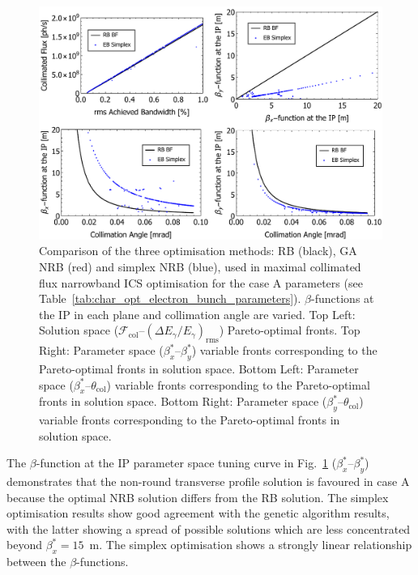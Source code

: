 \documentclass[../main.tex]{subfiles}
\begin{document}
\begin{figure}[!h]
\centering
\includegraphics[width=\textwidth]{Figures/Optimisation_and_Characterisation_of_Inverse_Compton_Scattering_Sources/CaseAoptcomp.pdf}
\caption{Comparison of the three optimisation methods: RB (black), GA NRB (red) and simplex NRB (blue), used in maximal collimated flux narrowband ICS optimisation for the case A parameters (see Table~\ref{tab:char_opt_electron_bunch_parameters}). $\beta$-functions at the IP in each plane and collimation angle are varied. Top Left: Solution space ($\mathcal{F}_{\mathrm{col}}$--$\left(\Delta E_{\gamma}/E_{\gamma}\right)_{\mathrm{rms}}$) Pareto-optimal fronts. Top Right: Parameter space ($\beta_{x}^{*}$--$\beta_{y}^{*}$) variable fronts corresponding to the Pareto-optimal fronts in solution space. Bottom Left: Parameter space ($\beta_{x}^{*}$--$\theta_{\mathrm{col}}$) variable fronts corresponding to the Pareto-optimal fronts in solution space. Bottom Right: Parameter space ($\beta_{y}^{*}$--$\theta_{\mathrm{col}}$) variable fronts corresponding to the Pareto-optimal fronts in solution space.}
\label{fig:case_A_optimisation_comparison}
\end{figure}

The $\beta$-function at the IP parameter space tuning curve in Fig.~\ref{fig:case_A_optimisation_comparison} ($\beta_{x}^{*}$--$\beta_{y}^{*}$) demonstrates that the non-round transverse profile solution is favoured in case A because the optimal NRB solution differs from the RB solution. The simplex optimisation results show good agreement with the genetic algorithm results, with the latter showing a spread of possible solutions which are less concentrated beyond $\beta_{x}^{*} = 15$~\si{\meter}. The simplex optimisation shows a strongly linear relationship between the $\beta$-functions. 
\end{document}
